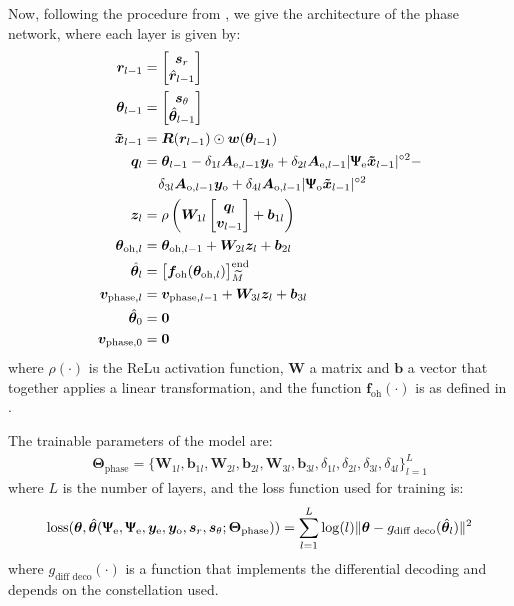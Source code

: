 Now, following the procedure from \cite{Neev_2019}, we give the architecture of the phase network, where each layer is given by:
\begin{align}
	\bm{r}_{l-1} &= \begin{bmatrix}\bm s_r\\\hat{\bm r}_{l-1}\end{bmatrix}\\
	\bm{\theta}_{l-1} &= \begin{bmatrix}\bm s_\theta\\\hat{\bm \theta}_{l-1}\end{bmatrix}\\
	\bm{\tilde{x}}_{l-1}&=\bm R(\bm{r}_{l-1})\odot\bm w(\bm\theta_{l-1})\\
	\bm q_l& = \bm{\theta}_{l-1} -\delta_{1l}\bm A_{\text{e},l-1}\bm y_\text{e} +\delta_{2l}\bm A_{\text{e},l-1}|\bm{\bm{\Uppsi}_\text{e}\tilde{x}}_{l-1}|^{\circ2}-\nonumber\\
	&\;\;\;\;\delta_{3l}\bm A_{\text{o},l-1}\bm y_\text{o} +\delta_{4l}\bm A_{\text{o},l-1}|\bm{\bm{\Uppsi}_\text{o}\tilde{x}}_{l-1}|^{\circ2}\\
	\bm z_l&=\rho\left( \bm W_{1l}\begin{bmatrix}\bm q_l\\\bm v_{l-1}\end{bmatrix}+\bm b_{1l}\right)\\
	\bm{\theta}_{\text{oh},l} &= \bm{\theta}_{\text{oh},l-1}+\bm W_{2l}\bm z_l+\bm b_{2l}\\
	\hat{\bm{\theta}}_{l} &= \bigl[\bm f_{\text{oh}}(\bm{\theta}_{\text{oh},l})\bigr]_{\widetilde{M}}^{\text{end}}\\
	\bm v_{\text{phase},l}&=\bm v_{\text{phase},l-1}+\bm W_{3l}\bm z_l+\bm b_{3l}\\
	\hat{\bm{\theta}}_{0} &= \bm 0\\
	\bm v_{\text{phase},0}&=\bm 0\\
\end{align}
where $\rho(\cdot)$ is the ReLu activation function, $\bm W$ a matrix and $\bm b$ a vector that together applies a linear transformation, and  the function $\bm f_{\text{oh}}(\cdot)$ is as defined in \cite{Neev_2019}.

The trainable parameters of the model are:
\begin{align}
	\bm \Theta_\text{phase} = \bigl\{\bm W_{1l},\bm b_{1l},\bm W_{2l},\bm b_{2l},\bm W_{3l},\bm b_{3l},\delta_{1l},\delta_{2l},\delta_{3l},\delta_{4l}  \bigr\}_{l=1}^L
\end{align}
where $L$ is the number of layers, and the loss function used for training is:
\begin{align}
	\text{loss}(\bm \theta, \hat{\bm \theta}(\bm{\Uppsi}_\text{e},\bm{\Uppsi}_\text{e},\bm y_\text{e},\bm y_\text{o},\bm s_r,\bm s_\theta;\bm \Theta_\text{phase}))=\sum_{l=1}^L\log(l)\lVert \bm \theta-g_\text{diff deco}(\hat{\bm{\theta}}_{l})\rVert^2
\end{align}
where $g_\text{diff deco}(\cdot)$ is a function that implements the differential decoding and depends on the constellation used.






